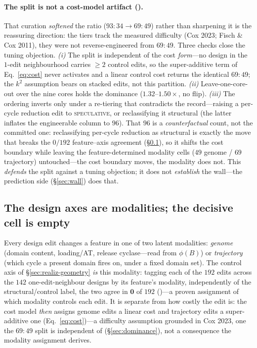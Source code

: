 \paragraph{The split is not a cost-model artifact ().} That curation
\emph{softened} the ratio ($93\!:\!34\to69\!:\!49$) rather than sharpening it is the reassuring direction:
the tiers track the measured difficulty (Cox 2023; Fisch \& Cox 2011), they were not reverse-engineered
from $69\!:\!49$. Three checks close the tuning objection. \emph{(i)} The split is independent of the cost
\emph{form}---no design in the $1$-edit neighbourhood carries $\ge2$ control edits, so the super-additive
term of Eq.~\eqref{eq:cost} never activates and a linear control cost returns the identical $69\!:\!49$; the
$k^2$ assumption bears on stacked edits, not this partition. \emph{(ii)} Leave-one-core-out over the nine
cores holds the dominance ($1.32$--$1.50\times$, no flip). \emph{(iii)} The ordering inverts only under a
re-tiering that contradicts the record---raising a per-cycle reduction edit to \textsc{speculative}, or
reclassifying it structural (the latter inflates the engineerable column to $96$). That $96$ is a
\emph{counterfactual} count, not the committed one: reclassifying per-cycle reduction as structural is
exactly the move that breaks the $0/192$ feature--axis agreement (\S\ref{sec:modality-cells}), so it shifts
the cost boundary while leaving the feature-determined modality cells ($49$ genome / $69$ trajectory)
untouched---the cost boundary moves, the modality does not. This \emph{defends} the split against a tuning
objection; it does not \emph{establish} the wall---the prediction side (\S\ref{sec:wall}) does that.

\subsection{The design axes are modalities; the decisive cell is empty}\label{sec:modality-cells}
Every design edit changes a feature in one of two latent modalities: \emph{genome} (domain content,
loading/AT, release cyclase---read from $\phi(B)$) or \emph{trajectory} (which cycle a present domain fires
on, under a fixed domain set). The control axis of \S\ref{sec:realiz-geometry} \emph{is} this modality:
tagging each of the $192$ edits across the $142$ one-edit-neighbour designs by its feature's modality,
independently of the structural/control label, the two agree in $\mathbf{0}$ of $192$ ()---a proven assignment of which modality controls each edit. It is separate from how costly the
edit is: the cost model \emph{then} assigns genome edits a linear cost and trajectory edits a super-additive
one (Eq.~\eqref{eq:cost})---a difficulty assumption grounded in Cox 2023, one the $69\!:\!49$ split is
independent of (\S\ref{sec:dominance}), not a consequence the modality assignment derives.

